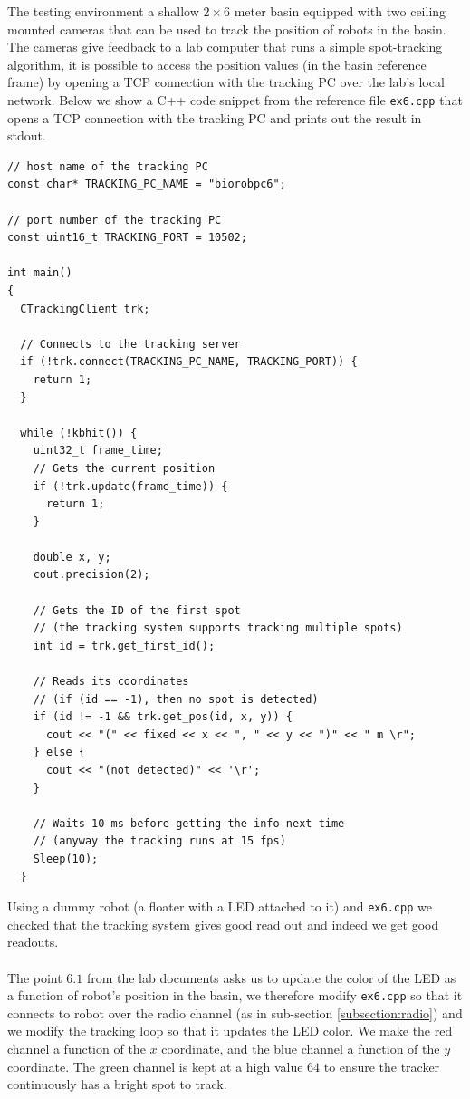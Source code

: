 \documentclass[11pt]{article}
\begin{document}
The testing environment a shallow $2 \times 6$ meter basin equipped with two ceiling mounted cameras that can be used to track the position of robots in the basin. The cameras give feedback to a lab computer that runs a simple spot-tracking algorithm, it is possible to access the position values (in the basin reference frame) by opening a TCP connection with the tracking PC over the lab's local network. Below we show a C++ code snippet from the reference file \texttt{ex6.cpp} that opens a TCP connection with the tracking PC and prints out the result in stdout.
\begin{verbatim}
// host name of the tracking PC
const char* TRACKING_PC_NAME = "biorobpc6";   

// port number of the tracking PC
const uint16_t TRACKING_PORT = 10502;          

int main()
{
  CTrackingClient trk;

  // Connects to the tracking server
  if (!trk.connect(TRACKING_PC_NAME, TRACKING_PORT)) {
    return 1;
  }

  while (!kbhit()) {
    uint32_t frame_time;
    // Gets the current position
    if (!trk.update(frame_time)) {
      return 1;
    }

    double x, y;
    cout.precision(2);
    
    // Gets the ID of the first spot
    // (the tracking system supports tracking multiple spots)
    int id = trk.get_first_id();
    
    // Reads its coordinates 
    // (if (id == -1), then no spot is detected)
    if (id != -1 && trk.get_pos(id, x, y)) {
      cout << "(" << fixed << x << ", " << y << ")" << " m \r";
    } else {
      cout << "(not detected)" << '\r';
    }
    
    // Waits 10 ms before getting the info next time 
    // (anyway the tracking runs at 15 fps)
    Sleep(10);
  }
\end{verbatim}
Using a dummy robot (a floater with a LED attached to it) and \texttt{ex6.cpp} we checked that the tracking system gives good read out and indeed we get good readouts. 
\\ \\
The point $6.1$ from the lab documents asks us to update the color of the LED as a function of robot's position in the basin, we therefore modify \texttt{ex6.cpp} so that it connects to robot over the radio channel (as in sub-section \ref{subsection:radio}) and we modify the tracking loop so that it updates the LED color. We make the red channel a function of the $x$ coordinate, and the blue channel a function of the $y$ coordinate. The green channel is kept at a high value $64$ to ensure the tracker continuously has a bright spot to track.
\end{document}
